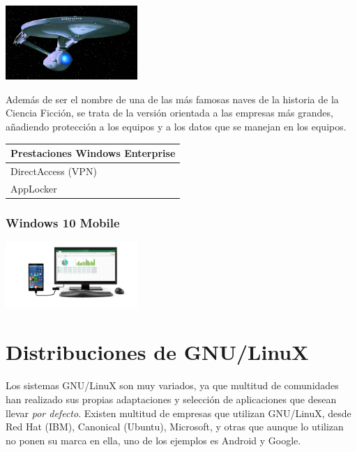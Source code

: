 \documentclass[11pt]{article}
\begin{document}
\begin{center}
\includegraphics[width=5cm]{./imgs/win10-enterprise.jpg}
\end{center}

Además de ser el nombre de una de las más famosas naves de la historia de la Ciencia Ficción, 
se trata de la versión orientada a las empresas más grandes, añadiendo protección a los equipos
y a los datos que se manejan en los equipos.

\begin{center}
\begin{tabular}{l}
Prestaciones Windows Enterprise\\
\hline
DirectAccess (VPN)\\
AppLocker\\
\end{tabular}
\end{center}


\newpage
\subsubsection{Windows 10 Mobile}
\label{sec:org0952735}

\begin{center}
\includegraphics[width=5cm]{./imgs/win10-mobile.jpg}
\end{center}



\newpage
\section{Distribuciones de GNU/LinuX}
\label{sec:orgdd120fc}
Los sistemas GNU/LinuX son muy variados, ya que multitud de comunidades
han realizado sus propias adaptaciones y selección de aplicaciones que
desean llevar \emph{por defecto}. Existen multitud de empresas que utilizan
GNU/LinuX, desde Red Hat (IBM), Canonical (Ubuntu), Microsoft, y otras
que aunque lo utilizan no ponen su marca en ella, uno de los ejemplos es
Android y Google.
\end{document}
